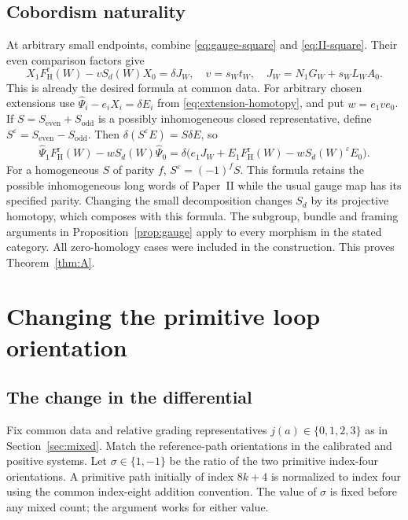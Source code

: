 \documentclass[11pt]{amsart}
\theoremstyle{definition}
\theoremstyle{remark}
\theoremstyle{plain}
\newcommand{\eps}{\varepsilon}
\newcommand{\FH}{F_{\mathrm H}}
\begin{document}
\subsection{Cobordism naturality}
At arbitrary small endpoints, combine \eqref{eq:gauge-square}
and \eqref{eq:II-square}. Their even comparison factors give
\begin{equation}\label{eq:common-square}
 X_1\FH^{\mathrm r}(W)-vS_d(W)X_0=\delta J_W,
 \quad v=s_Wt_W,
 \quad J_W=N_1G_W+s_WL_WA_0.
\end{equation}
This is already the desired formula at common data. For arbitrary
chosen extensions use
$\widehat\Psi_i-e_iX_i=\delta E_i$ from
\eqref{eq:extension-homotopy}, and put $w=e_1ve_0$.
If $S=S_{\mathrm{even}}+S_{\mathrm{odd}}$ is a possibly
inhomogeneous closed representative, define
$S^\eps=S_{\mathrm{even}}-S_{\mathrm{odd}}$. Then
$\delta(S^\eps E)=S\delta E$, so
\begin{align}\label{eq:final-homotopy}
 \widehat\Psi_1\FH^{\mathrm r}(W)-wS_d(W)\widehat\Psi_0
 =\delta\bigl(e_1J_W+E_1\FH^{\mathrm r}(W)
                    -wS_d(W)^\eps E_0\bigr).
\end{align}
For a homogeneous $S$ of parity $f$, $S^\eps=(-1)^fS$.
This formula retains the possible inhomogeneous long words of
Paper~II while the usual gauge map has its specified parity.
Changing the small decomposition changes $S_d$ by its projective
homotopy, which composes with this formula. The subgroup, bundle
and framing arguments in Proposition~\ref{prop:gauge} apply to
every morphism in the stated category. All zero-homology cases
were included in the construction. This proves Theorem~\ref{thm:A}.

\section{Changing the primitive loop orientation}\label{sec:correction}

\subsection{The change in the differential}
Fix common data and relative grading representatives
$j(a)\in\{0,1,2,3\}$ as in Section~\ref{sec:mixed}. Match the
reference-path orientations in the calibrated and positive systems.
Let $\sigma\in\{1,-1\}$ be the ratio of the two primitive
index-four orientations. A primitive path initially of index
$8k+4$ is normalized to index four using the common index-eight
addition convention. The value of $\sigma$ is fixed before
any mixed count; the argument works for either value.
\end{document}
